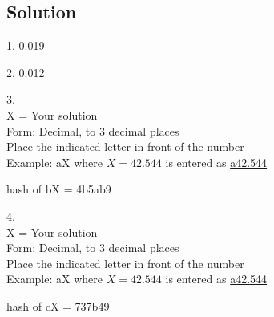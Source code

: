\subsection*{Solution}
1. \num{0.019}

2. \num{0.012}

3.\\
X = Your solution\\
Form: Decimal, to 3 decimal places\\
Place the indicated letter in front of the number\\
Example: aX where $X=42.544$ is entered as \href{http://www.wolframalpha.com/input/?i=md5+hash+of+\%22a42.544\%22}{a42.544}

hash of bX = 4b5ab9

4.\\
X = Your solution\\
Form: Decimal, to 3 decimal places\\
Place the indicated letter in front of the number\\
Example: aX where $X=42.544$ is entered as \href{http://www.wolframalpha.com/input/?i=md5+hash+of+\%22a42.544\%22}{a42.544}

hash of cX = 737b49


